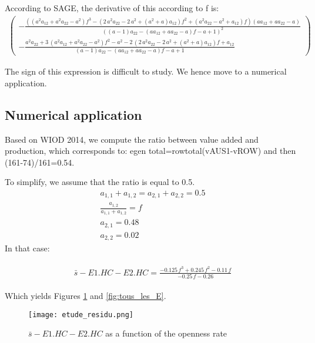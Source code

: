 \documentclass[12pt,a4paper]{article}
\begin{document}
According to SAGE, the derivative of this according to f is: 
\begin{gather*}
\left(\begin{array}{r}
-\frac{{\left({\left(a^{2} a_{12} + a^{2} a_{22} - a^{2}\right)} f^{3} - {\left(2 \, a^{2} a_{22} - 2 \, a^{2} + {\left(a^{2} + a\right)} a_{12}\right)} f^{2} + {\left(a^{2} a_{22} - a^{2} + a_{12}\right)} f\right)} {\left(a a_{12} + a a_{22} - a\right)}}{{\left({\left(a - 1\right)} a_{22} - {\left(a a_{12} + a a_{22} - a\right)} f - a + 1\right)}^{2}} \\
- \frac{a^{2} a_{22} + 3 \, {\left(a^{2} a_{12} + a^{2} a_{22} - a^{2}\right)} f^{2} - a^{2} - 2 \, {\left(2 \, a^{2} a_{22} - 2 \, a^{2} + {\left(a^{2} + a\right)} a_{12}\right)} f + a_{12}}{{\left(a - 1\right)} a_{22} - {\left(a a_{12} + a a_{22} - a\right)} f - a + 1}
\end{array}\right)
\end{gather*}

The sign of this expression is difficult to study. We hence move to a numerical application.

\subsection*{Numerical application}
Based on WIOD 2014, we compute the ratio between value added and production, which corresponds to: 
egen total=rowtotal(vAUS1-vROW) and then (161-74)/161=0.54.

To simplify, we assume that the ratio is equal to 0.5.
\begin{gather*}
a_{1,1}+a_{1,2}=a_{2,1}+a_{2,2}=0.5 \\
\frac{a_{1,2}}{a_{1,1}+a_{1,2}}=f \\
a_{2,1}=0.48 \\
a_{2,2}=0.02
\end{gather*}
In that case:

\begin{gather*}
\begin{array}{r}
\bar{s}-E1.HC-E2.HC = \frac{-0.125 \, f^{3} + 0.245 \, f^{2} - 0.11 \, f}{-0.25 \, f - 0.26
}
\end{array}
\end{gather*}

Which yields Figures \ref{fig:resid} and \ref{fig:tous_les_E}.
\begin{figure}[H]
	\begin{center}
		\texttt{[image: etude\_residu.png]}
		\caption{$\bar{s}-E1.HC-E2.HC$ as a function of the openness rate}
		\label{fig:resid}
	\end{center}
\end{figure}
\end{document}
